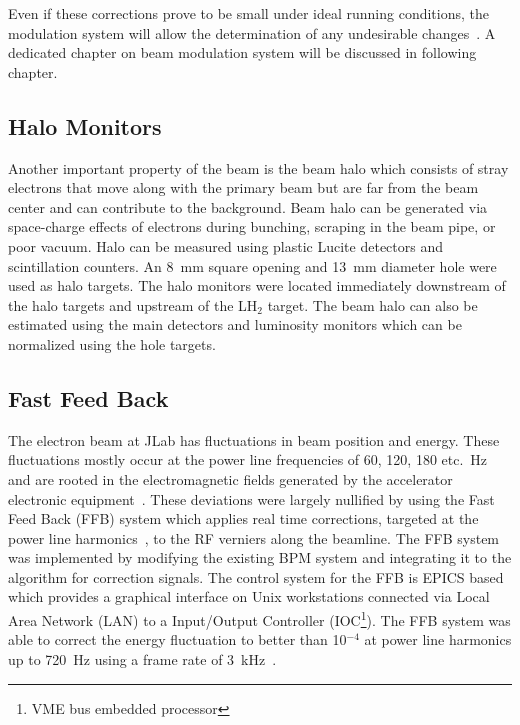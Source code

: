 Even if these corrections prove to be small under ideal running conditions, the modulation system will allow the determination of any undesirable changes~\cite{nur_bm_final}. 
A dedicated chapter on beam modulation system will be discussed in following chapter.



\subsection{Halo Monitors}%
\label{Halo Monitors}

Another important property of the beam is the beam halo which consists of stray electrons that move along with the primary beam but are far from the beam center and can contribute to the background. Beam halo can be generated via space-charge effects of electrons during bunching, scraping in the beam pipe, or poor vacuum.  Halo can be measured using plastic Lucite detectors and scintillation counters. 
An 8~mm square opening and 13~mm diameter hole were used as halo targets. The halo monitors were located immediately downstream of the halo targets and upstream of the LH$_{2}$ target. The beam halo can also be estimated using the main detectors and luminosity monitors which can be normalized using the hole targets.


\subsection{Fast Feed Back}%
\label{Fast Feed Back}

The electron beam at JLab has fluctuations in beam position and energy. These fluctuations mostly occur at the power line frequencies of 60, 120, 180 etc.~Hz and are rooted in the electromagnetic fields generated by the accelerator electronic equipment~\cite{jlab_ffb1}. These deviations were largely nullified by using the Fast Feed Back (FFB) system which applies real time corrections, targeted at the power line harmonics~\cite{jlab_ffb2}, to the RF verniers along the beamline. The FFB system was implemented by modifying the existing BPM system and integrating it to the algorithm for correction signals. The control system for the FFB is EPICS based which provides a graphical interface on Unix workstations connected via Local Area Network (LAN) to a Input/Output Controller (IOC\footnote{VME bus embedded processor}). The FFB system was able to correct the energy fluctuation to better than 10$^{-4}$ at power line harmonics up to 720~Hz using a frame rate of 3~kHz~\cite{jlab_ffb1}.

